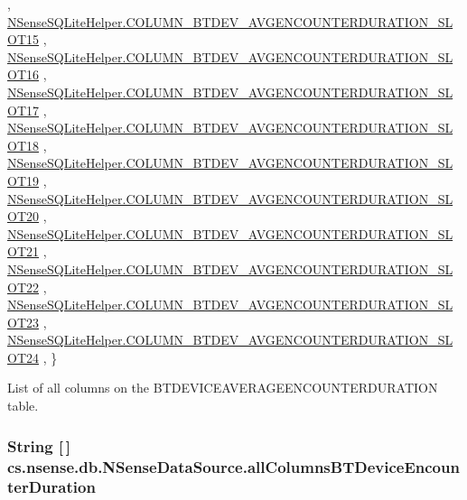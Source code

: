 \begin{DoxyCode}
      ,
            \hyperlink{classcs_1_1nsense_1_1db_1_1_n_sense_s_q_lite_helper_aa2b4166df8ffcaed76068483d9d21fba}{NSenseSQLiteHelper.COLUMN\_BTDEV\_AVGENCOUNTERDURATION\_SLOT15}
      ,
            \hyperlink{classcs_1_1nsense_1_1db_1_1_n_sense_s_q_lite_helper_aefa4e03242dc91e4ce441bf0b0936178}{NSenseSQLiteHelper.COLUMN\_BTDEV\_AVGENCOUNTERDURATION\_SLOT16}
      ,
            \hyperlink{classcs_1_1nsense_1_1db_1_1_n_sense_s_q_lite_helper_a183659b2ef2e1a2d36150b9e84e04879}{NSenseSQLiteHelper.COLUMN\_BTDEV\_AVGENCOUNTERDURATION\_SLOT17}
      ,
            \hyperlink{classcs_1_1nsense_1_1db_1_1_n_sense_s_q_lite_helper_a0b5f29f21cf17f536bb4ae191e040417}{NSenseSQLiteHelper.COLUMN\_BTDEV\_AVGENCOUNTERDURATION\_SLOT18}
      ,
            \hyperlink{classcs_1_1nsense_1_1db_1_1_n_sense_s_q_lite_helper_a0ae214906e5fdc66a00c2b5f2771ca65}{NSenseSQLiteHelper.COLUMN\_BTDEV\_AVGENCOUNTERDURATION\_SLOT19}
      ,
            \hyperlink{classcs_1_1nsense_1_1db_1_1_n_sense_s_q_lite_helper_a553da8f0e3082738bd9fe051ab40e362}{NSenseSQLiteHelper.COLUMN\_BTDEV\_AVGENCOUNTERDURATION\_SLOT20}
      ,
            \hyperlink{classcs_1_1nsense_1_1db_1_1_n_sense_s_q_lite_helper_a528a19b3974495bed3ac33c1d638ca5d}{NSenseSQLiteHelper.COLUMN\_BTDEV\_AVGENCOUNTERDURATION\_SLOT21}
      ,
            \hyperlink{classcs_1_1nsense_1_1db_1_1_n_sense_s_q_lite_helper_afd369ed86e5e3f1e23acd11fabe385ab}{NSenseSQLiteHelper.COLUMN\_BTDEV\_AVGENCOUNTERDURATION\_SLOT22}
      ,
            \hyperlink{classcs_1_1nsense_1_1db_1_1_n_sense_s_q_lite_helper_a0554b63beef7b9ee6c6f5e4e567a1048}{NSenseSQLiteHelper.COLUMN\_BTDEV\_AVGENCOUNTERDURATION\_SLOT23}
      ,
            \hyperlink{classcs_1_1nsense_1_1db_1_1_n_sense_s_q_lite_helper_a1658e2b1ff310225d5a5ffc818a9809f}{NSenseSQLiteHelper.COLUMN\_BTDEV\_AVGENCOUNTERDURATION\_SLOT24}
      ,
    \}
\end{DoxyCode}
List of all columns on the B\-T\-D\-E\-V\-I\-C\-E\-A\-V\-E\-R\-A\-G\-E\-E\-N\-C\-O\-U\-N\-T\-E\-R\-D\-U\-R\-A\-T\-I\-O\-N table. \hypertarget{classcs_1_1nsense_1_1db_1_1_n_sense_data_source_abc7aef7fd9e1c686bc6e12596e69b67f}{
\subsubsection[{all\-Columns\-B\-T\-Device\-Encounter\-Duration}]{\setlength{\rightskip}{0pt plus 5cm}String \mbox{[}$\,$\mbox{]} cs.\-nsense.\-db.\-N\-Sense\-Data\-Source.\-all\-Columns\-B\-T\-Device\-Encounter\-Duration\hspace{0.3cm}{\ttfamily [private]}}}\label{classcs_1_1nsense_1_1db_1_1_n_sense_data_source_abc7aef7fd9e1c686bc6e12596e69b67f}
